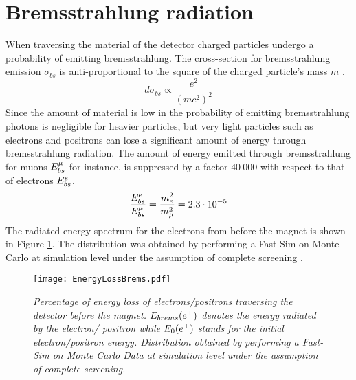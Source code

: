 \section{Bremsstrahlung radiation}
\label{sec:bremsstrahlung}
When traversing the material of the detector charged particles undergo a probability of emitting bremsstrahlung. The cross-section for bremsstrahlung emission $\sigma_{bs}$ is anti-proportional to the square of the charged particle's mass $m$ \cite{WRLeo}.
\begin{equation}
 d\sigma_{bs} \propto \frac{e^2}{(mc^2)^2}
\end{equation}
Since the amount of material is low in \lhcb the probability of emitting bremsstrahlung photons is negligible for heavier particles, but very light particles such as electrons and positrons can lose a significant amount of energy through bremsstrahlung radiation. The amount of energy emitted through bremsstrahlung for muons $E_{bs}^{\mu}$ for instance, is suppressed by a factor $40\ 000$ with respect to that of electrons $E_{bs}^{e}$.
\begin{equation}
\frac{E_{bs}^{e}}{E_{bs}^{\mu}} = \frac{m_{e}^2}{m_{\mu}^2} = 2.3 \cdot 10^{-5} 
\label{eq:evsmu}
\end{equation}
The radiated energy spectrum for the electrons from \BdKstee before the \lhcb magnet is shown in Figure \ref{fig:totalEnergyLossBrems}. The distribution was obtained by performing a Fast-Sim \cite{ananote} on Monte Carlo at simulation level under the assumption of complete screening \cite{pdg}.
\begin{figure}[ht]
  \begin{center}
    \texttt{[image: EnergyLossBrems.pdf]}
    \end{center}
    	\vspace*{-0.8cm}
  \caption{\textit{Percentage of energy loss of electrons/positrons traversing the \lhcb detector before the magnet. $E_{brems}(e^\pm)$ denotes the energy radiated by the electron/ positron while $E_0(e^\pm)$ stands for the initial electron/positron energy. Distribution obtained by performing a Fast-Sim on Monte Carlo Data at simulation level under the assumption of complete screening.}}
  \label{fig:totalEnergyLossBrems}
\end{figure}

